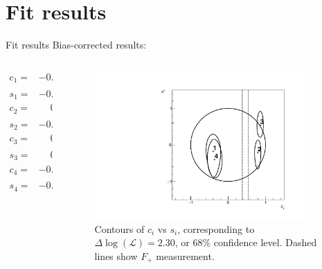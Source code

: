 \documentclass{beamer}
\begin{document}
\section{Fit results}
\begin{frame}{Fit results}
  Bias-corrected results:
  \vspace{-0.5cm}
  \begin{columns}
    \begin{column}{0.4\textwidth}
      \begin{align*}
        c_1 =& {-0.37} \pm 0.13 \pm 0.01 \\
        s_1 =& {-0.21}_{-0.28}^{+0.45} \pm 0.04 \\
        c_2 =& \phantom{-}0.79 \pm 0.06 \pm 0.01 \\
        s_2 =& {-0.27}_{-0.18}^{+0.37} \pm 0.03 \\
        c_3 =& \phantom{-}0.87 \pm 0.06 \pm 0.01 \\
        s_3 =& \phantom{-}0.58_{-0.45}^{+0.17} \pm 0.06 \\
        c_4 =& {-0.33} \pm 0.13 \pm 0.01 \\
        s_4 =& {-0.48}_{-0.26}^{+0.48} \pm 0.05 \\
      \end{align*}
    \end{column}
    \begin{column}{0.6\textwidth}
      \begin{figure}
        \includegraphics[width=0.9\textwidth]{Plots/Contours_cisi.pdf}
        \caption{Contours of $c_i$ vs $s_i$, corresponding to $\Delta\log(\mathcal{L}) = 2.30$, or $68\%$ confidence level. Dashed lines show $F_+$ measurement.}
      \end{figure}
    \end{column}
  \end{columns}
\end{frame}
\end{document}
